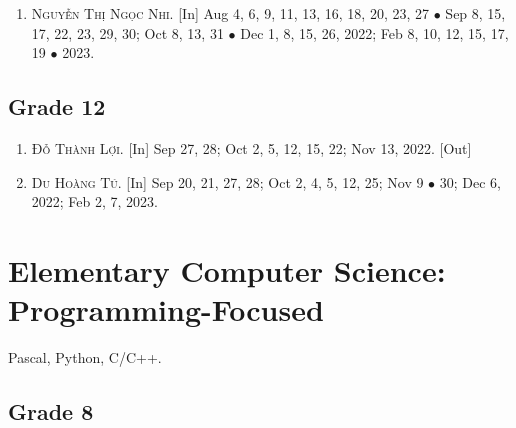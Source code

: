 \documentclass{article}
\numberwithin{equation}{section}
\begin{document}
\begin{enumerate}
	\item \textsc{Nguyễn Thị Ngọc Nhi.} \textsf{[In]} Aug 4, 6, 9, 11, 13, 16, 18, 20, 23, 27 $\bullet$ Sep 8, 15, 17, 22, 23, 29, 30; Oct 8, 13, 31 $\bullet$ Dec 1, 8,  15, 26, 2022; Feb 8, 10, 12, 15, 17, 19 $\bullet$ 2023.
\end{enumerate}

\subsection{Grade 12}

\begin{enumerate}
	\item \textsc{Đỗ Thành Lợi.} \textsf{[In]} Sep 27, 28; Oct 2, 5, 12, 15, 22; Nov 13, 2022. \textsf{[Out]}
	\item \textsc{Du Hoàng Tú.} \textsf{[In]} Sep 20, 21, 27, 28; Oct 2, 4, 5, 12, 25; Nov 9 $\bullet$ 30; Dec 6, 2022; Feb 2, 7, 2023.
\end{enumerate}


\section{Elementary Computer Science: Programming-Focused}
Pascal, Python, C\textsf{/}C++.

\subsection{Grade 8}
\end{document}
